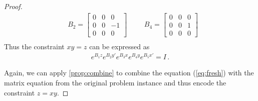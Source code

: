 \begin{proof}
\begin{align*}
&B_2=\begin{bmatrix}0&0&0\\0&0&-1\\0&0&0\end{bmatrix} &&
&B_4=\begin{bmatrix}0&0&0\\0&0&1\\0&0&0\end{bmatrix} \\
\end{align*}
Thus the constraint $xy=z$ can be expressed as
\begin{gather}
e^{B_1z} e^{B_2y'} e^{B_3x} e^{B_4y} e^{B_5x'} = I \, .
\label{eq:fresh}
\end{gather}

Again, we can apply \cref{prop:combine} to combine the
equation (\ref{eq:fresh}) with the matrix equation from the original
problem instance and thus encode the constraint $z=xy$.


\end{proof}
